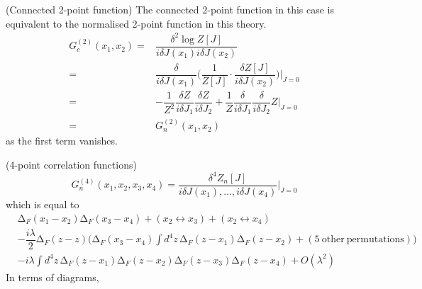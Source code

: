 \begin{ex}
(Connected 2-point function) The connected 2-point function in this case is equivalent to the normalised 2-point function in this theory.
\[\begin{align*}
G_{c}^{(2)}(x_1,x_2)=&\dfrac{\delta ^2\log Z[J]}{i\delta J(x_1)i\delta J(x_2)}\\
=&\dfrac{\delta }{i\delta J(x_1)}\Big(\dfrac{1}{Z[J]}\cdot \dfrac{\delta Z[J]}{i\delta J(x_2)}\Big)\Big|_{J=0}\\
=&-\dfrac{1}{Z^2}\dfrac{\delta Z}{i\delta J_1} \dfrac{\delta Z}{i\delta J_2}+\dfrac{1}{Z}\dfrac{\delta }{i\delta J_1}\dfrac{\delta }{i\delta J_{2}}Z\Big|_{J=0}\\
=&G_{n}^{(2)}(x_1,x_2)
\end{align*}\]
as the first term vanishes.
\end{ex}
\vspace{2ex}
\begin{ex}
(4-point correlation functions) 
\[G_{n}^{(4)}(x_1,x_2,x_3,x_4)=\dfrac{\delta ^{4}Z_{n}[J]}{i\delta J(x_1),\ldots ,i\delta J(x_4)}\Big|_{J=0}\]
which is equal to
\[\begin{align*}
&\mathrm{\Delta }_{F}(x_1-x_2)\mathrm{\Delta }_{F}(x_3-x_4)+(x_2\leftrightarrow x_3)+(x_2\leftrightarrow x_4)\\
&-\dfrac{i\lambda }{2}\mathrm{\Delta }_{F}(z-z)\Big(\mathrm{\Delta }_{F}(x_3-x_4)\int d^{4}z\,\mathrm{\Delta }_{F}(z-x_1)\mathrm{\Delta }_{F}(z-x_2)+(5\mathrm{\ other\ permutations})\Big)\\
&-i\lambda \int d^{4}z\,\mathrm{\Delta }_{F}(z-x_1)\mathrm{\Delta }_{F}(z-x_2)\mathrm{\Delta }_{F}(z-x_3)\mathrm{\Delta }_{F}(z-x_{4})+O(\lambda ^2)
\end{align*}\]
In terms of diagrams,

\end{ex}
\vspace{2ex}

